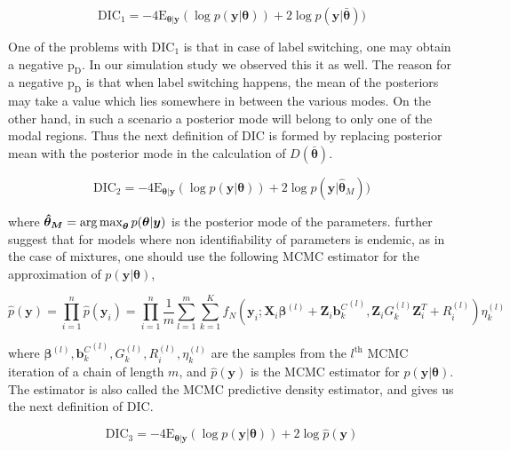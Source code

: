 \begin{equation}
\label{eq : DIC1}
\text{DIC}_1 = -4\text{E}_{\boldsymbol{\theta}|\boldsymbol{y}} (\log{p(\boldsymbol{y}|\boldsymbol{\theta})}) + 2\log{p(\boldsymbol{y}|\boldsymbol{\bar{\theta}})})
\end{equation}

One of the problems with $\text{DIC}_1$ is that in case of label switching, one may obtain a negative $\text{p}_\text{D}$. In our simulation study we observed this it as well. The reason for a negative $\text{p}_\text{D}$ is that when label switching happens, the mean of the posteriors may take a value which lies somewhere in between the various modes. On the other hand, in such a scenario a posterior mode will belong to only one of the modal regions. Thus the next definition of DIC is formed by replacing posterior mean with the posterior mode in the calculation of $D(\boldsymbol{\bar{\theta}})$.

\begin{equation}
\label{eq : DIC2}
\text{DIC}_2 = -4\text{E}_{\boldsymbol{\theta}|\boldsymbol{y}} (\log{p(\boldsymbol{y}|\boldsymbol{\theta})}) + 2\log{p(\boldsymbol{y}|\boldsymbol{\hat{\theta}}_M)})
\end{equation}

where
$\boldsymbol{\hat{\theta}_M} = \operatorname*{arg\,max}_{\boldsymbol{\theta}}p(\boldsymbol{\theta}|\boldsymbol{y})$ is the posterior mode of the parameters. \citet{celeux_deviance_2006} further suggest that for models where non identifiability of parameters is endemic, as in the case of mixtures, one should use the following MCMC estimator for the approximation of $p(\boldsymbol{y}|\boldsymbol{\theta})$,

$$\hat{p}(\boldsymbol{y}) = \prod_{i=1}^n \hat{p}(\boldsymbol{y}_i) = \prod_{i=1}^n \frac 1 m \sum_{l=1}^m \sum_{k=1}^K f_N(\boldsymbol{y}_i; \boldsymbol{X}_i\boldsymbol{\beta}^{(l)} + \boldsymbol{Z}_i {\boldsymbol{b}_k^C}^{(l)}, \boldsymbol{Z}_{i} G_k^{(l)} \boldsymbol{Z}_{i}^T+ R_i^{(l)}) \eta_k^{(l)}$$

where $\boldsymbol{\beta}^{(l)}, {\boldsymbol{b}_k^C}^{(l)}, G_k^{(l)}, R_i^{(l)}, \eta_k^{(l)}$ are the samples from the $l^{\text{th}}$ MCMC iteration of a chain of length $m$, and $\hat{p}(\boldsymbol{y})$ is the MCMC estimator for $p(\boldsymbol{y}|\boldsymbol{\theta})$. The estimator is also called the MCMC predictive density estimator, and gives us the next definition of DIC.

\begin{equation}
\label{eq : DIC3}
\text{DIC}_3 =-4\text{E}_{\boldsymbol{\theta}|\boldsymbol{y}} (\log{p(\boldsymbol{y}|\boldsymbol{\theta})}) + 2\log{\hat{p}(\boldsymbol{y})}
\end{equation}

